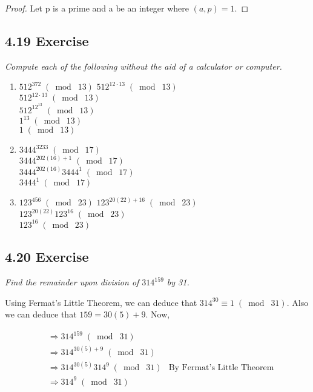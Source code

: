 \documentclass{article}
\begin{document}
\begin{proof}
Let p is a prime and a be an integer where $(a,p) = 1$.
\end{proof}

\subsection*{4.19 Exercise} 
\quad \textit{Compute each of the following without the aid of a calculator or computer.}

\begin{enumerate}
    \item $512^{372} \;(\bmod\; 13)$
          $512^{12 \cdot 13} \;(\bmod\; 13)$\\
          $512^{12 \cdot 13} \;(\bmod\; 13)$\\
          $512^12^13 \;(\bmod\; 13)$\\
          $1^13 \;(\bmod\; 13)$\\
          $1 \;(\bmod\; 13)$
    \item $3444^{3233} \;(\bmod\; 17)$\\
          $3444^{202(16) + 1} \;(\bmod\; 17)$\\
          $3444^{202(16)}3444^1 \;(\bmod\; 17)$\\
          $3444^1 \;(\bmod\; 17)$
    \item $123^{456} \;(\bmod\; 23)$
          $123^{20(22) + 16} \;(\bmod\; 23)$\\
          $123^{20(22)}123^16 \;(\bmod\; 23)$\\
          $123^16 \;(\bmod\; 23)$
\end{enumerate}

\subsection*{4.20 Exercise} 
\quad \textit{Find the remainder upon division of $314^{159}$ by 31.}

Using Fermat's Little Theorem, we can deduce that $314^{30} \equiv 1 \;(\bmod\; 31)$. Also we can deduce that $159 = 30(5) + 9$. Now,

\begin{align*}
    &\Longrightarrow 314^{159} \;(\bmod\; 31)&\\
    &\Longrightarrow 314^{30(5) + 9} \;(\bmod\; 31)&\\
    &\Longrightarrow 314^{30(5)}314^9 \;(\bmod\; 31)&\text{By Fermat's Little Theorem}\\
    &\Longrightarrow 314^9 \;(\bmod\; 31)&\\
\end{align*}
\end{document}
